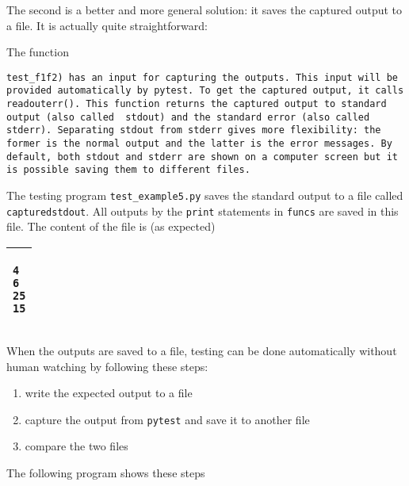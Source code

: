 
The second is a better and more general solution: it saves the
captured output to a file. It is actually quite straightforward:

\resetlinenumber[1]
\linenumbers
\begin{tt}
  
\end{tt}
\nolinenumbers


The function {\tt test\_f1f2) has an input for capturing the outputs.
  This input will be provided automatically by {\tt pytest}.  To get
  the captured output, it calls {\tt readouterr()}.  This function
  returns the captured output to standard output (also called {\tt
    stdout}) and the standard error (also called {\tt stderr}).
  Separating {\tt stdout} from {\tt stderr} gives more flexibility:
  the former is the normal output and the latter is the error
  messages.  By default, both {\tt stdout} and {\tt stderr} are shown
  on a computer screen but it is possible saving them to different
  files.

  The testing program {\tt test\_example5.py} saves the standard
  output to a file called {\tt capturedstdout}. All outputs by the
  {\tt print} statements in {\tt funcs} are saved in this file.
  The content of the file is (as expected)

 
\vspace{0.2in}

\noindent
\begin{tabular}{|p{5in}|}\hline
\begin{verbatim}
4
6
25
15
\end{verbatim}
\\ \hline
\end{tabular}
\vspace{0.2in}

When the outputs are saved to a file, testing can be done automatically
without human watching by following these steps:

\begin{enumerate}
\item write the expected output to a file
\item capture the output from {\tt pytest} and save it to another file
\item compare the two files
\end{enumerate}

The following program shows these steps

}
